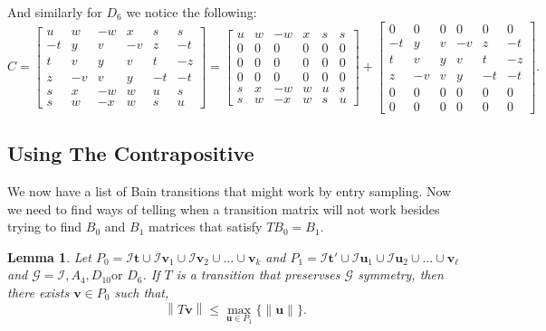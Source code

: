 \documentclass[a4paper,10pt]{article}
\theoremstyle{plain}
\newtheorem{Lemma}[Theorem]{Lemma}
\theoremstyle{definition}
\theoremstyle{remark}
\renewcommand{\vec}[1]{\textbf{#1}}
\newcommand\norm[1]{\left\lVert#1\right\rVert}
\begin{document}
And similarly for \(D_6\) we notice the following:
\[C = \begin{bmatrix}
    u  & w  & -w & x  & s  & s  \\
    -t & y  & v  & -v & z  & -t \\
    t  & v  & y  & v  & t  & -z \\
    z  & -v & v  & y  & -t & -t \\
    s  & x  & -w & w  & u  & s  \\
    s  & w  & -x & w  & s  & u 
\end{bmatrix} = \begin{bmatrix}
    u  & w  & -w & x  & s  & s  \\
    0 & 0 & 0 & 0 & 0 & 0 \\
    0 & 0 & 0 & 0 & 0 & 0 \\
    0 & 0 & 0 & 0 & 0 & 0 \\
    s  & x  & -w & w  & u  & s  \\
    s  & w  & -x & w  & s  & u 
\end{bmatrix} + \begin{bmatrix}
    0 & 0 & 0 & 0 & 0 & 0 \\
    -t & y  & v  & -v & z  & -t \\
    t  & v  & y  & v  & t  & -z \\
    z  & -v & v  & y  & -t & -t \\
    0 & 0 & 0 & 0 & 0 & 0 \\
    0 & 0 & 0 & 0 & 0 & 0
\end{bmatrix}.\]



\subsection{Using The Contrapositive}
We now have a list of Bain transitions that might work by entry sampling.
Now we need to find ways of telling when a transition matrix will not work besides trying to find \(B_0\) and \(B_1\) matrices that satisfy \(TB_0 = B_1\).

\begin{Lemma}
    Let \(P_0 = \mathcal{I}\vec{t} \cup \mathcal{I}\vec{v}_1 \cup \mathcal{I}\vec{v}_2 \cup \dots \cup \vec{v}_k\) and \(P_1 = \mathcal{I}\vec{t}' \cup \mathcal{I}\vec{u}_1 \cup \mathcal{I}\vec{u}_2 \cup \dots \cup \vec{v}_\ell\) and \(\mathcal{G} = \mathcal{I}, A_4, D_{10} \text{or } D_6\).
    If \(T\) is a transition that preservses \(\mathcal{G}\) symmetry, then there exists \(\vec{v} \in P_0\) such that, \[\norm{T\vec{v}} \leq \max_{\vec{u} \in P_1}\{\norm{\vec{u}}\}.\] 
\end{Lemma}
\end{document}
